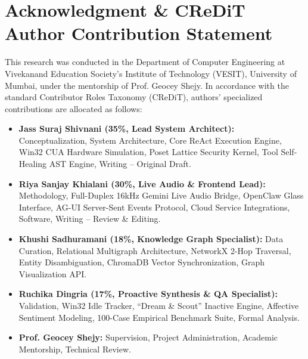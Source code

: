 \documentclass[conference,a4paper]{IEEEtran}
\begin{document}
\section*{Acknowledgment \& CReDiT Author Contribution Statement}

This research was conducted in the Department of Computer Engineering at Vivekanand Education Society's Institute of Technology (VESIT), University of Mumbai, under the mentorship of Prof. Geocey Shejy. In accordance with the standard Contributor Roles Taxonomy (CReDiT), authors' specialized contributions are allocated as follows:
\begin{itemize}
    \item \textbf{Jass Suraj Shivnani (35\%, Lead System Architect):} Conceptualization, System Architecture, Core ReAct Execution Engine, Win32 CUA Hardware Simulation, Poset Lattice Security Kernel, Tool Self-Healing AST Engine, Writing -- Original Draft.
    \item \textbf{Riya Sanjay Khialani (30\%, Live Audio \& Frontend Lead):} Methodology, Full-Duplex 16kHz Gemini Live Audio Bridge, OpenClaw Glass Interface, AG-UI Server-Sent Events Protocol, Cloud Service Integrations, Software, Writing -- Review \& Editing.
    \item \textbf{Khushi Sadhuramani (18\%, Knowledge Graph Specialist):} Data Curation, Relational Multigraph Architecture, NetworkX 2-Hop Traversal, Entity Disambiguation, ChromaDB Vector Synchronization, Graph Visualization API.
    \item \textbf{Ruchika Dingria (17\%, Proactive Synthesis \& QA Specialist):} Validation, Win32 Idle Tracker, ``Dream \& Scout'' Inactive Engine, Affective Sentiment Modeling, 100-Case Empirical Benchmark Suite, Formal Analysis.
    \item \textbf{Prof. Geocey Shejy:} Supervision, Project Administration, Academic Mentorship, Technical Review.
\end{itemize}
\end{document}
